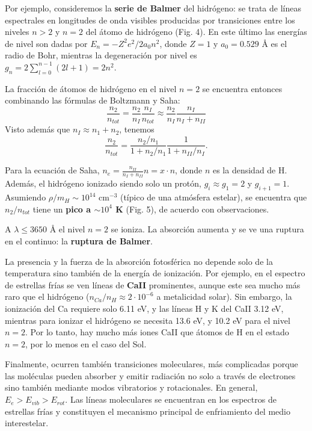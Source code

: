 \documentclass[11pt,letterpaper]{article}
\begin{document}
Por ejemplo, consideremos la \textbf{serie de Balmer} del hidrógeno: se trata de líneas espectrales en longitudes de onda visibles producidas por transiciones entre los niveles \(n > 2\) y \(n = 2\) del átomo de hidrógeno (Fig. 4). En este último las energías de nivel son dadas por \(E_n = -Z^2 e^2/2a_0 n^2\), donde \(Z = 1\) y \(a_0 = 0.529\) \AA{} es el radio de Bohr, mientras la degeneración por nivel es \(g_n = 2 \sum_{l=0}^{n-1} (2l+1) = 2n^2\).

La fracción de átomos de hidrógeno en el nivel \(n = 2\) se encuentra entonces combinando las fórmulas de Boltzmann y Saha:
\begin{equation}
    \frac{n_2}{n_{tot}} = \frac{n_2}{n_I} \frac{n_I}{n_{tot}} \approx \frac{n_2}{n_I} \frac{n_I}{n_I + n_{II}}
\end{equation}
Visto además que \(n_I \approx n_1 + n_2\), tenemos
\begin{equation}
    \frac{n_2}{n_{tot}} = \frac{n_2/n_1}{1 + n_2/n_1} \frac{1}{1 + n_{II}/n_I}.
\end{equation}

Para la ecuación de Saha, \(n_e = \frac{n_{II}}{n_I + n_{II}} n = x \cdot n\), donde \(n\) es la densidad de H. Además, el hidrógeno ionizado siendo solo un protón, \(g_i \approx g_1 = 2\) y \(g_{i+1} = 1\). Asumiendo \(\rho/m_H \sim 10^{14}\) cm\(^{-3}\) (típico de una atmósfera estelar), se encuentra que \(n_2/n_{tot}\) tiene un \textbf{pico a \(\sim 10^4\) K} (Fig. 5), de acuerdo con observaciones.

A \(\lambda \le 3650\) \AA{} el nivel \(n = 2\) se ioniza. La absorción aumenta y se ve una ruptura en el continuo: la \textbf{ruptura de Balmer}.

La presencia y la fuerza de la absorción fotosférica no depende solo de la temperatura sino también de la energía de ionización. Por ejemplo, en el espectro de estrellas frías se ven líneas de \textbf{CaII} prominentes, aunque este sea mucho más raro que el hidrógeno (\(n_{Ca}/n_H \approx 2 \cdot 10^{-6}\) a metalicidad solar). Sin embargo, la ionización del Ca requiere solo 6.11 eV, y las líneas H y K del CaII 3.12 eV, mientras para ionizar el hidrógeno se necesita 13.6 eV, y 10.2 eV para el nivel \(n = 2\). Por lo tanto, hay mucho más iones CaII que átomos de H en el estado \(n = 2\), por lo menos en el caso del Sol.

Finalmente, ocurren también transiciones moleculares, más complicadas porque las moléculas pueden absorber y emitir radiación no solo a través de electrones sino también mediante modos vibratorios y rotacionales. En general, \(E_e > E_{vib} > E_{rot}\). Las líneas moleculares se encuentran en los espectros de estrellas frías y constituyen el mecanismo principal de enfriamiento del medio interestelar.
\end{document}
